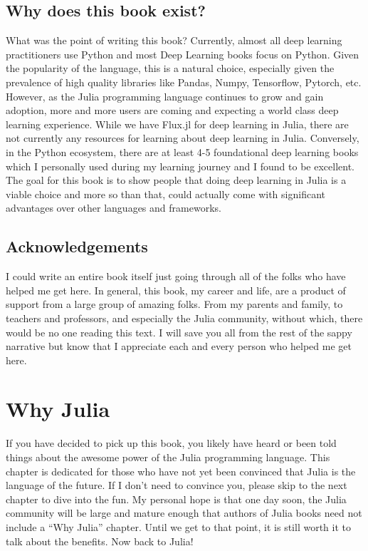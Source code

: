 \documentclass[
  notoc %
]{tufte-book}
\begin{document}
\hypertarget{sec:book_motivation}{%
\section{Why does this book exist?}\label{sec:book_motivation}}

What was the point of writing this book? Currently, almost all deep
learning practitioners use Python and most Deep Learning books focus on
Python. Given the popularity of the language, this is a natural choice,
especially given the prevalence of high quality libraries like Pandas,
Numpy, Tensorflow, Pytorch, etc. However, as the Julia programming
language continues to grow and gain adoption, more and more users are
coming and expecting a world class deep learning experience. While we
have Flux.jl for deep learning in Julia, there are not currently any
resources for learning about deep learning in Julia. Conversely, in the
Python ecosystem, there are at least 4-5 foundational deep learning
books which I personally used during my learning journey and I found to
be excellent. The goal for this book is to show people that doing deep
learning in Julia is a viable choice and more so than that, could
actually come with significant advantages over other languages and
frameworks.

\hypertarget{sec:acknowledgements}{%
\section{Acknowledgements}\label{sec:acknowledgements}}

I could write an entire book itself just going through all of the folks
who have helped me get here. In general, this book, my career and life,
are a product of support from a large group of amazing folks. From my
parents and family, to teachers and professors, and especially the Julia
community, without which, there would be no one reading this text. I
will save you all from the rest of the sappy narrative but know that I
appreciate each and every person who helped me get here.

\hypertarget{sec:why_julia}{%
\chapter{Why Julia}\label{sec:why_julia}}

If you have decided to pick up this book, you likely have heard or been
told things about the awesome power of the Julia programming language.
This chapter is dedicated for those who have not yet been convinced that
Julia is the language of the future. If I don't need to convince you,
please skip to the next chapter to dive into the fun. My personal hope
is that one day soon, the Julia community will be large and mature
enough that authors of Julia books need not include a ``Why Julia''
chapter. Until we get to that point, it is still worth it to talk about
the benefits. Now back to Julia!
\end{document}

